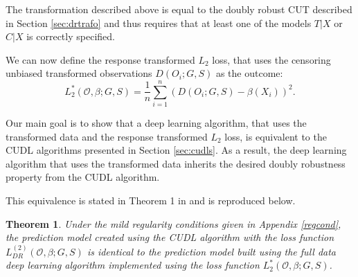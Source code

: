 \documentclass[12pt, a4paper]{scrartcl}
\theoremstyle{definition}
\theoremstyle{plain}
\newtheorem{Theorem}{Theorem}[section]
\numberwithin{equation}{section}
\numberwithin{figure}{section}
\numberwithin{table}{section}
\begin{document}
	The transformation described above is equal to the doubly robust CUT described in Section \ref{sec:drtrafo} and thus requires that at least one of the models $T\vert X$ or $C \vert X$ is correctly specified.
	
	We can now define the response transformed $L_2$ loss, that uses the censoring unbiased transformed observations $D(O_i;G,S)$ as the outcome:
	\begin{equation*}
	L_2^*(\mathcal{O}, \beta; G,S) = \frac{1}{n} \sum_{i=1}^n (D(O_i;G,S)-\beta(X_i))^2.
	\end{equation*}
	
	Our main goal is to show that a deep learning algorithm, that uses the transformed data and the response transformed $L_2$ loss, is equivalent to the CUDL algorithms presented in Section \ref{sec:cudls}.
	As a result, the deep learning algorithm that uses the transformed data inherits the desired doubly robustness property from the CUDL algorithm.
	
	This equivalence is stated in Theorem 1 in \citet*{basearticle} and is reproduced below.
	
	\begin{Theorem}\label{thm:equi}
		Under the mild regularity conditions given in Appendix \ref{regcond}, the prediction model created using the CUDL algorithm with the loss function $L_{DR}^{(2)}(\mathcal{O}, \beta; G,S)$ is identical to the prediction model built using the full data deep learning algorithm implemented using the loss function $L_2^*(\mathcal{O}, \beta; G,S)$.
	\end{Theorem}
	
\end{document}
